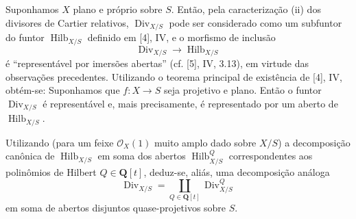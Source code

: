 Suponhamos $X$ plano e próprio sobre $S$. Então, pela caracterização (ii) dos
divisores de Cartier relativos, $\operatorname{Div}_{X/S}$ pode ser considerado
como um subfuntor do funtor $\operatorname{Hilb}_{X/S}$ definido em [4], IV, e o
morfismo de inclusão
\[
\operatorname{Div}_{X/S}\longrightarrow\operatorname{Hilb}_{X/S}
\]
é ``representável por imersões abertas'' (cf. [5], IV, 3.13), em virtude das
observações precedentes. Utilizando o teorema principal de existência de [4],
IV, obtém-se:
 Suponhamos que $f:X\longrightarrow S$ seja projetivo
e plano. Então o funtor $\operatorname{Div}_{X/S}$ é representável e, mais
precisamente, é representado por um aberto de $\operatorname{Hilb}_{X/S}$.

Utilizando (para um feixe $\mathcal O_X(1)$ muito amplo dado sobre $X/S$) a
decomposição canônica de $\operatorname{Hilb}_{X/S}$ em soma dos abertos
$\operatorname{Hilb}^{Q}_{X/S}$ correspondentes aos polinômios de Hilbert
$Q\in\mathbf Q[t]$, deduz-se, aliás, uma decomposição análoga
\[
\operatorname{Div}_{X/S}=
\coprod_{Q\in\mathbf Q[t]}\operatorname{Div}^{Q}_{X/S}
\]
em soma de abertos disjuntos quase-projetivos sobre $S$.

